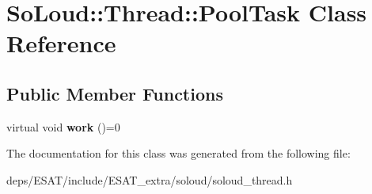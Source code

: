 \hypertarget{class_so_loud_1_1_thread_1_1_pool_task}{}\section{So\+Loud\+:\+:Thread\+:\+:Pool\+Task Class Reference}
\label{class_so_loud_1_1_thread_1_1_pool_task}
\subsection*{Public Member Functions}
\begin{DoxyCompactItemize}
\item 
\mbox{\label{class_so_loud_1_1_thread_1_1_pool_task_a9f442c060d3964d6b845709548cae8dc}} 
virtual void {\bfseries work} ()=0
\end{DoxyCompactItemize}


The documentation for this class was generated from the following file\+:\begin{DoxyCompactItemize}
\item 
deps/\+E\+S\+A\+T/include/\+E\+S\+A\+T\+\_\+extra/soloud/soloud\+\_\+thread.\+h\end{DoxyCompactItemize}
